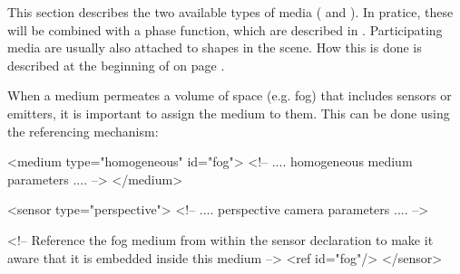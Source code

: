 This section describes the two available types of media
( and ). In pratice, these
will be combined with a phase function, which are described in .
Participating media are usually also attached to shapes in the scene.
How this is done is described at the beginning of  on page
\pageref{sec:shapes}.

When a medium permeates a volume of space (e.g. fog) that includes sensors or emitters,
it is important to assign the medium to them. This can be done using the
referencing mechanism:

\begin{xml}
<medium type="homogeneous" id="fog">
    <!-- .... homogeneous medium parameters .... -->
</medium>

<sensor type="perspective">
    <!-- .... perspective camera parameters .... -->

    <!-- Reference the fog medium from within the sensor declaration
         to make it aware that it is embedded inside this medium -->
    <ref id="fog"/>
</sensor>
\end{xml}

